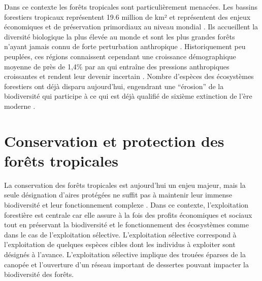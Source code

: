 \documentclass[
  11pt,
  french,
  A4paper,
  extrafontsizes,onecolumn,openright
  ]{memoir}
\begin{document}
Dans ce contexte les forêts tropicales sont particulièrement menacées.
Les bassins forestiers tropicaux représentent 19.6 million de km² et
représentent des enjeux économiques et de préservation primordiaux au
niveau mondial \autocites{Dirzo2003a}{Hansen2013}. Ils accueillent la
diversité biologique la plus élevée au monde et sont les plus grandes
forêts n'ayant jamais connu de forte perturbation anthropique
\autocites{Gentry1988}{FAO2011}. Historiquement peu peuplées, ces
régions connaissent cependant une croissance démographique moyenne de
près de 1,4\% par an qui entraîne des pressions anthropiques croissantes
et rendent leur devenir incertain \autocite{Asner2009}. Nombre d'espèces
des écosystèmes forestiers ont déjà disparu aujourd'hui, engendrant une
``érosion'' de la biodiversité qui participe à ce qui est déjà qualifié
de sixième extinction de l'ère moderne
\autocites{Vitousek1997}{Cardinale2012}.

\section{Conservation et protection des forêts
tropicales}\label{conservation-et-protection-des-forets-tropicales}

La conservation des forêts tropicales est aujourd'hui un enjeu majeur,
mais la seule désignation d'aires protégées ne suffit pas à maintenir
leur immense biodiversité et leur fonctionnement complexe
\autocite{Sist2015}. Dans ce contexte, l'exploitation forestière est
centrale car elle assure à la fois des profits économiques et sociaux
tout en préservant la biodiversité et le fonctionnement des écosystèmes
comme dans le cas de l'exploitation sélective. L'exploitation sélective
correspond à l'exploitation de quelques espèces cibles dont les
individus à exploiter sont désignés à l'avance. L'exploitation sélective
implique des trouées éparses de la canopée et l'ouverture d'un réseau
important de dessertes pouvant impacter la biodiversité des forêts.
\end{document}
